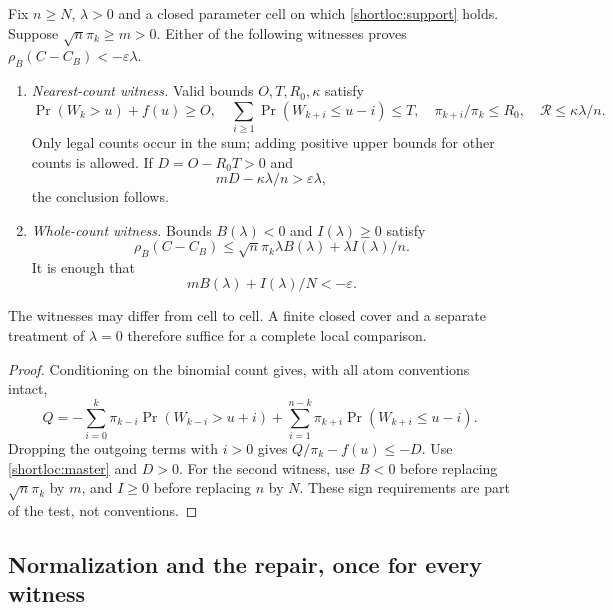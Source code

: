 \begin{samepage}
\begin{theorem}\label{shortloc:theorem}
Fix $n\ge N$, $\lambda>0$ and a closed parameter cell on which
\eqref{shortloc:support} holds. Suppose $\sqrt n\pi_k\ge m>0$.
Either of the following witnesses proves $\rho_B(C-C_B)<-\varepsilon\lambda$.
\begin{enumerate}
\item \emph{Nearest-count witness.} Valid bounds $O,T,R_0,\kappa$ satisfy
\[
 \Pr(W_k>u)+f(u)\ge O,\quad
 \sum_{i\ge1}\Pr(W_{k+i}\le u-i)\le T,\quad
 \pi_{k+i}/\pi_k\le R_0,\quad \mathcal R\le\kappa\lambda/n.
\]
Only legal counts occur in the sum; adding positive upper bounds for
other counts is allowed. If $D=O-R_0T>0$ and
\begin{equation}\label{shortloc:directtest}
             mD-\kappa\lambda/n>\varepsilon\lambda,
\end{equation}
the conclusion follows.
\item \emph{Whole-count witness.} Bounds $B(\lambda)<0$ and $I(\lambda)\ge0$
satisfy
\[
 \rho_B(C-C_B)\le\sqrt n\pi_k\lambda B(\lambda)
                                      +\lambda I(\lambda)/n.
\]
It is enough that
\begin{equation}\label{shortloc:whole-test}
                  mB(\lambda)+I(\lambda)/N<-\varepsilon.
\end{equation}
\end{enumerate}
The witnesses may differ from cell to cell. A finite closed cover and a
separate treatment of $\lambda=0$ therefore suffice for a complete local
comparison.
\end{theorem}
\end{samepage}
\begin{proof}
Conditioning on the binomial count gives, with all atom conventions intact,
\begin{equation}\label{shortloc:count}
 Q=-\sum_{i=0}^{k}\pi_{k-i}\Pr(W_{k-i}>u+i)
       +\sum_{i=1}^{n-k}\pi_{k+i}\Pr(W_{k+i}\le u-i).
\end{equation}
Dropping the outgoing terms with $i>0$ gives $Q/\pi_k-f(u)\le-D$.
Use \eqref{shortloc:master} and $D>0$. For the second witness, use
$B<0$ before replacing $\sqrt n\pi_k$ by $m$, and $I\ge0$ before replacing
$n$ by $N$. These sign requirements are part of the test, not conventions.
\end{proof}

\subsection{Normalization and the repair, once for every witness}

